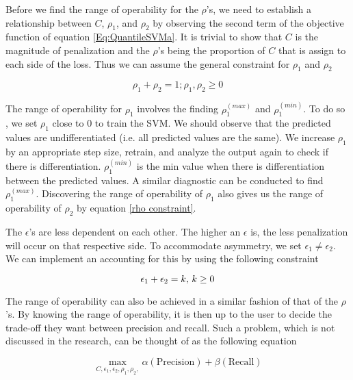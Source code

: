 \documentclass[twoside,11pt]{article}
\begin{document}
 Before we find the range of operability for the $\rho$'s, we need to establish a relationship between $C$, $\rho_1$, and $\rho_2$ by observing the second term of the objective function of equation \ref{Eq:QuantileSVMa}. It is trivial to show that $C$ is the magnitude of penalization and the $\rho$'s being the proportion of $C$ that is assign to each side of the loss. Thus we can assume the general constraint for $\rho_1$ and $\rho_2$

\begin{equation}\label{rho constraint}
\rho_1 + \rho_2 =1; \rho_1,\rho_2 \geq 0
\end{equation}

The range of operability for $\rho_1$ involves the finding $\rho_1^{(max)}$ and $\rho_1^{(min)}$. To do so , we set $\rho_1$ close to 0 to train the SVM. We should observe that the predicted values are undifferentiated (i.e. all predicted values are the same). We increase $\rho_1$ by an appropriate step size, retrain, and analyze the output again to check if there is differentiation. $\rho_1^{(min)}$ is the min value when there is differentiation between the predicted values. A similar diagnostic can be conducted to find $\rho_1^{(max)}$. Discovering the range of operability of $\rho_1$ also gives us the range of operability of $\rho_2$ by equation \ref{rho constraint}.

The $\epsilon$'s are less dependent on each other. The higher an $\epsilon$ is, the less penalization will occur on that respective side. To accommodate asymmetry, we set $\epsilon_1 \neq \epsilon_2$. We can implement an accounting for this by using the following constraint

\begin{equation}\label{epsilon constraint}
\epsilon_1 + \epsilon_2=k \\
\text{, } k \geq 0
\end{equation}

The range of operability can also be achieved in a similar fashion of that of the $\rho$'s. By knowing the range of operability, it is then up to the user to decide the trade-off they want between precision and recall. Such a problem, which is not discussed in the research, can be thought of as the following equation 

\begin{equation}\label{eqn:asymmetryutility}
 \max_{C,\epsilon_1,\epsilon_2,\rho_1,\rho_2,} \alpha(\text{Precision}) + \beta(\text{Recall})
 \end{equation}
\end{document}
